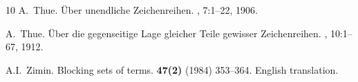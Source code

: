\documentclass[]{elsart}
\begin{document}
\begin{thebibliography}{10}
A.~Thue.
\newblock \"{U}ber unendliche {Z}eichenreihen.
, 7:1--22, 1906.

A.~Thue.
\newblock \"{U}ber die gegenseitige {L}age gleicher {T}eile gewisser {Z}eichenreihen.
, 10:1--67, 1912.

 A.I.~Zimin.
\newblock Blocking sets of terms.
 {\bf 47(2)} (1984) 353--364. English translation.

\end{thebibliography}
\end{document}
